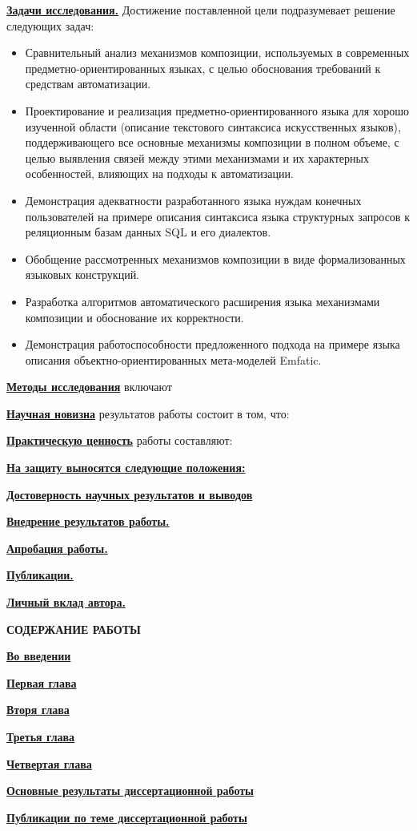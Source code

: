 \documentclass[12pt,a4paper]{article}
\newcommand{\afsection}[1]{\par \begin{center}\textbf{\MakeUppercase{#1}}\end{center}}
\newcommand{\afsubsection}[1]{\par \textbf{\underline{#1}}}
\begin{document}
\afsubsection{Задачи исследования.} Достижение поставленной цели подразумевает решение следующих задач:
\begin{itemize}
\item Сравнительный анализ механизмов композиции, используемых в современных предметно-ориентированных языках, с целью обоснования требований к средствам автоматизации.
\item Проектирование и реализация предметно-ориентированного языка для хорошо изученной области (описание текстового синтаксиса искусственных языков), поддерживающего все основные механизмы композиции в полном объеме, с целью выявления связей между этими механизмами и их характерных особенностей, влияющих на подходы к автоматизации.
\item Демонстрация адекватности разработанного языка нуждам конечных пользователей на примере описания синтаксиса языка структурных запросов к реляционным базам данных SQL и его диалектов.
\item Обобщение рассмотренных механизмов композиции в виде формализованных языковых конструкций.
\item Разработка алгоритмов автоматического расширения языка механизмами композиции и обоснование их корректности.
\item Демонстрация работоспособности предложенного подхода на примере языка описания объектно-ориентированных мета-моделей Emfatic.
\end{itemize}

\afsubsection{Методы исследования} включают

\afsubsection{Научная новизна} результатов работы состоит в том, что:

\afsubsection{Практическую ценность} работы составляют:

\afsubsection{На защиту выносятся следующие положения:} 

\afsubsection{Достоверность научных результатов и выводов}

\afsubsection{Внедрение результатов работы.} 

\afsubsection{Апробация работы.}

\afsubsection{Публикации.}

\afsubsection{Личный вклад автора.}

\afsection{Содержание работы}

\afsubsection{Во введении}

\afsubsection{Первая глава}

\afsubsection{Вторя глава}

\afsubsection{Третья глава}

\afsubsection{Четвертая глава}

\afsubsection{Основные результаты диссертационной работы}

\par
\begin{center}
\afsubsection{Публикации по теме диссертационной работы}
\end{center}
\end{document}
